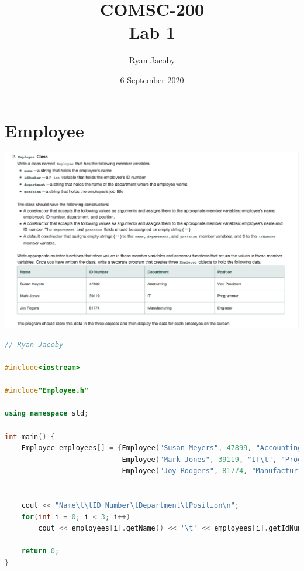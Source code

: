 \documentclass[letterpaper, 11pt]{article}
\title{COMSC-200 \\ Lab 1}
\author{Ryan Jacoby}
\date{6 September 2020}
\begin{document}
\maketitle

\section{Employee}
\includegraphics[scale=0.35]{employee.png} 

\begin{lstlisting}[language=C++, caption=main.cpp]
// Ryan Jacoby

#include<iostream>

#include"Employee.h"

using namespace std;

int main() {
    Employee employees[] = {Employee("Susan Meyers", 47899, "Accounting", "Vice President"),
                            Employee("Mark Jones", 39119, "IT\t", "Programmer"),
                            Employee("Joy Rodgers", 81774, "Manufacturing", "Engineer")};


    cout << "Name\t\tID Number\tDepartment\tPosition\n";
    for(int i = 0; i < 3; i++) 
        cout << employees[i].getName() << '\t' << employees[i].getIdNumber() << "\t\t" << employees[i].getDepartment() << '\t' << employees[i].getPosition() << '\n';

    return 0;
}    
\end{lstlisting}
\end{document}
